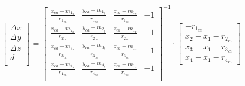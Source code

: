 $$
\begin{bmatrix}
\Delta{x} \\
\Delta{y} \\
\Delta{z} \\
d \\
\end{bmatrix}
=
{\begin{bmatrix}
\frac{x_{ca} - m_{1_x}}{r_{1_{ca}}} & \frac{y_{ca} - m_{1_y}}{r_{1_{ca}}} & \frac{z_{ca} - m_{1_z}}{r_{1_{ca}}} & -1 \\
\frac{x_{ca} - m_{2_x}}{r_{2_{ca}}} & \frac{y_{ca} - m_{2_y}}{r_{2_{ca}}} & \frac{z_{ca} - m_{1_z}}{r_{2_{ca}}} & -1 \\
\frac{x_{ca} - m_{3_x}}{r_{3_{ca}}} & \frac{y_{ca} - m_{3_y}}{r_{3_{ca}}} & \frac{z_{ca} - m_{1_z}}{r_{3_{ca}}} & -1 \\
\frac{x_{ca} - m_{4_x}}{r_{4_{ca}}} & \frac{y_{ca} - m_{4_y}}{r_{4_{ca}}} & \frac{z_{ca} - m_{1_z}}{r_{4_{ca}}} & -1 \\
\end{bmatrix}}^{-1}
\cdot
\begin{bmatrix}
-r_{1_{ca}}\\
x_2 - x_1 - r_{2_{ca}}\\
x_3 - x_1 - r_{3_{ca}}\\
x_4 - x_1 - r_{4_{ca}}
\end{bmatrix}
$$
